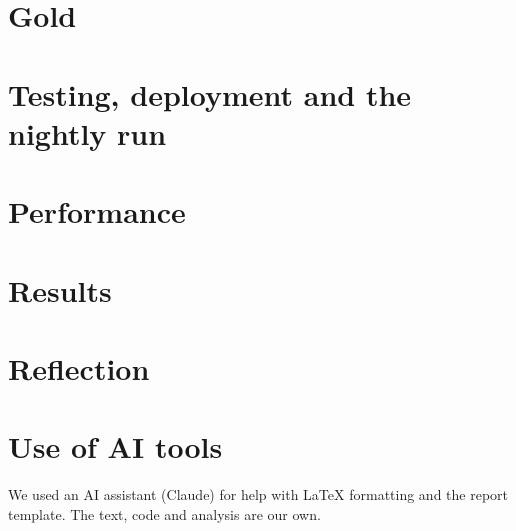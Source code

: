 \documentclass[sigconf]{acmart}
\begin{document}
\section{Gold}
\label{sec:gold}


\section{Testing, deployment and the nightly run}
\label{sec:lifecycle}


\section{Performance}
\label{sec:perf}


\section{Results}
\label{sec:results}


\section{Reflection}
\label{sec:reflection}


\section*{Use of AI tools}
We used an AI assistant (Claude) for help with LaTeX formatting and the report template.
The text, code and analysis are our own.



\end{document}
